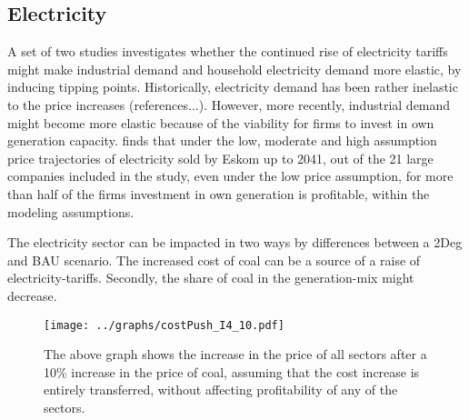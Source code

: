 \documentclass[12pt,english]{article}
\begin{document}


\subsection{Electricity}

A set of two studies investigates whether the continued rise of electricity tariffs might make industrial demand \citep{goliger2018electricity} and household electricity demand \citep{goliger2018household} more elastic, by inducing tipping points. Historically, electricity demand has been rather inelastic to the price increases (references...). However, more recently, industrial demand might become more elastic because of the viability for firms to invest in own generation capacity. \citep{goliger2018electricity} finds that under the low, moderate and high assumption price trajectories of electricity sold by Eskom up to 2041, out of the 21 large companies included in the study, even under the low price assumption, for more than half of the firms investment in own generation is profitable, within the modeling assumptions.


The electricity sector can be impacted in two ways by differences between a 2Deg and BAU scenario. The increased cost of coal can be a source of a raise of electricity-tariffs. Secondly, the share of coal in the generation-mix might decrease.

\begin{figure}[!h]
	\hspace{-10pt}\texttt{[image: ../graphs/costPush\_I4\_10.pdf]}
	\caption{\label{costPush_I4_10} The above graph shows the increase in the price of all sectors after a 10\% increase in the price of coal, assuming that the cost increase is entirely transferred, without affecting profitability of any of the sectors.}
\end{figure}
\end{document}
